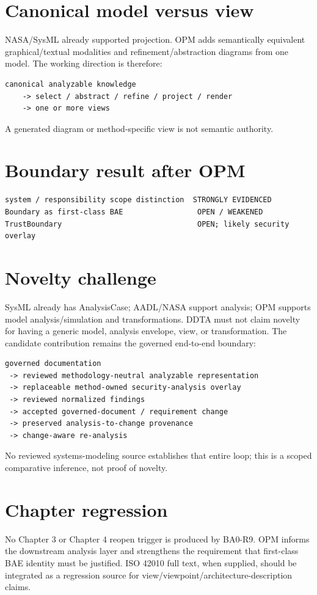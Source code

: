 \documentclass[10pt,a4paper]{article}
\begin{document}
\section{Canonical model versus view}
NASA/SysML already supported projection. OPM adds semantically equivalent graphical/textual modalities and refinement/abstraction diagrams from one model. The working direction is therefore:
\begin{lstlisting}
canonical analyzable knowledge
    -> select / abstract / refine / project / render
    -> one or more views
\end{lstlisting}
A generated diagram or method-specific view is not semantic authority.
\section{Boundary result after OPM}
\begin{lstlisting}
system / responsibility scope distinction  STRONGLY EVIDENCED
Boundary as first-class BAE                 OPEN / WEAKENED
TrustBoundary                               OPEN; likely security overlay
\end{lstlisting}
\section{Novelty challenge}
SysML already has AnalysisCase; AADL/NASA support analysis; OPM supports model analysis/simulation and transformations. DDTA must not claim novelty for having a generic model, analysis envelope, view, or transformation. The candidate contribution remains the governed end-to-end boundary:
\begin{lstlisting}
governed documentation
 -> reviewed methodology-neutral analyzable representation
 -> replaceable method-owned security-analysis overlay
 -> reviewed normalized findings
 -> accepted governed-document / requirement change
 -> preserved analysis-to-change provenance
 -> change-aware re-analysis
\end{lstlisting}
No reviewed systems-modeling source establishes that entire loop; this is a scoped comparative inference, not proof of novelty.
\section{Chapter regression}
No Chapter 3 or Chapter 4 reopen trigger is produced by BA0-R9. OPM informs the downstream analysis layer and strengthens the requirement that first-class BAE identity must be justified. ISO 42010 full text, when supplied, should be integrated as a regression source for view/viewpoint/architecture-description claims.
\end{document}
